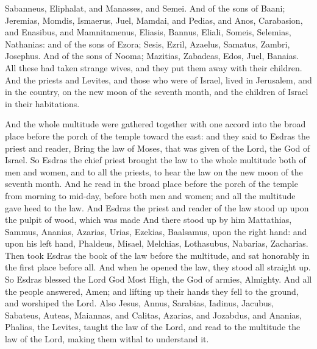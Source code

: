 { Sabanneus, Eliphalat, and Manasses, and Semei.
And of the sons of Baani; Jeremias, Momdis, Ismaerus, Juel, Mamdai, and Pedias, and Anos, Carabasion, and Enasibus, and Mamnitamenus, Eliasis, Bannus, Eliali, Someis, Selemias, Nathanias: and of the sons of Ezora; Sesis, Ezril, Azaelus, Samatus, Zambri, Josephus.
And of the sons of Nooma; Mazitias, Zabadeas, Edos, Juel, Banaias.
All these had taken strange wives, and they put them away with their children.
And the priests and Levites, and those who were of Israel, lived in Jerusalem, and in the country, on the new moon of the seventh month, and the children of Israel in their habitations.
\par }{\PP {} And the whole multitude were gathered together with one accord into the broad place before the porch of the temple toward the east:
and they said to Esdras the priest and reader, Bring the law of Moses, that was given of the Lord, the God of Israel.
So Esdras the chief priest brought the law to the whole multitude both of men and women, and to all the priests, to hear the law on the new moon of the seventh month.
And he read in the broad place before the porch of the temple from morning to mid-day, before both men and women; and
 all the multitude gave heed to the law.
And Esdras the priest and reader of the law stood up upon the pulpit of wood, which was made
{}
And there stood up by him Mattathias, Sammus, Ananias, Azarias, Urias,
 Ezekias, Baalsamus, upon the right hand:
and upon his left hand,
 Phaldeus, Misael, Melchias,
 Lothasubus, Nabarias, Zacharias.
Then took Esdras the book of the law before the multitude, and sat honorably in the first place before all.
And when he opened the law, they stood all straight up. So Esdras blessed the Lord God Most High, the God of armies, Almighty.
And all the people answered, Amen; and lifting up their hands they fell to the ground, and worshiped the Lord.
Also Jesus, Annus, Sarabias, Iadinus, Jacubus, Sabateus,
 Auteas, Maiannas, and Calitas, Azarias, and Jozabdus, and Ananias, Phalias, the Levites, taught the law of the Lord,
 and read to the multitude the law of the Lord, making them withal to understand it.
}
